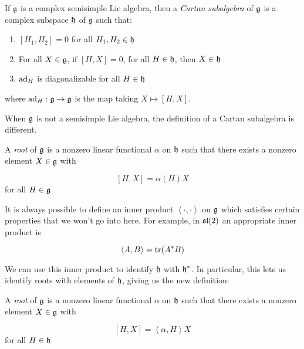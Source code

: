 \begin{defn}
    If $\mathfrak{g}$ is a complex semisimple Lie algebra, then a \emph{Cartan
        subalgebra} of $\mathfrak{g}$ is a complex subspace $\mathfrak{h}$ of
        $\mathfrak{g}$ such that: 
    \begin{enumerate}
        \renewcommand{\labelenumi}{\roman{enumi})}
        \item $\left[ H_1, H_2 \right] = 0$ for all $H_1, H_2 \in \mathfrak{h}$
        \item For all $X \in \mathfrak{g}$, if $\left[ H,X \right] = 0$, for all $H
            \in \mathfrak{h}$, then $X \in \mathfrak{h}$
        \item $\operatorname{ad}_H$ is diagonalizable for all $H \in \mathfrak{h}$
    \end{enumerate}
where $\operatorname{ad}_H: \mathfrak{g} \to \mathfrak{g}$ is the map taking $X \mapsto [H,X]$.
\end{defn}

When $\mathfrak{g}$ is not a semisimple Lie algebra, the definition of a Cartan
subalgebra is different.

\begin{defn}
A \emph{root} of $\mathfrak{g}$ is a nonzero linear functional $\alpha$ on $\mathfrak{h}$ such that there exists a nonzero element $X \in \mathfrak{g}$ with 

\begin{equation}
\left[ H,X \right] = \alpha(H)X
\end{equation}
for all $H \in \mathfrak{g}$
\end{defn}

It is always possible to define an inner product $\left<\cdot,\cdot\right>$ on
$\mathfrak{g}$ which satisfies certain properties that we won't go into here. For
example, in $\mathfrak{sl}(2)$ an appropriate inner product is 

\begin{equation}
\left<A,B\right> = \operatorname{tr}(A^*B)
\end{equation}

We can use this inner product to identify $\mathfrak{h}$ with $\mathfrak{h}^*$. In
particular, this lets us identify roots with elements of $\mathfrak{h}$, giving us
the new definition:

\begin{defn}
A \emph{root} of $\mathfrak{g}$ is a nonzero linear functional $\alpha$ on $\mathfrak{h}$
such that there exists a nonzero element $X \in \mathfrak{g}$ with 

\begin{equation}
\left[ H,X \right] = \left<\alpha,H\right>X
\end{equation}
for all $H \in \mathfrak{h}$
\end{defn}

